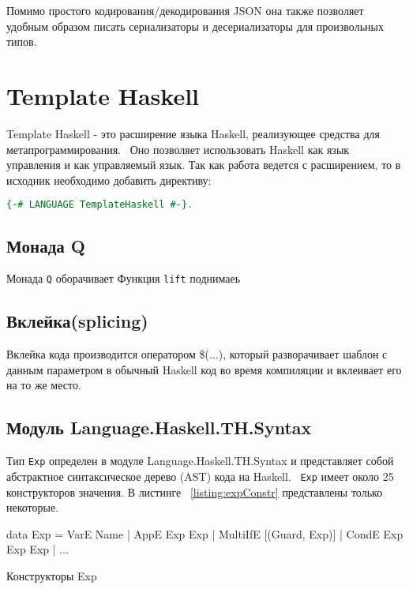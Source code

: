 Помимо простого кодирования/декодирования JSON она также позволяет удобным образом писать сериализаторы и десериализаторы для произвольных типов.

\section{Template Haskell}

Template Haskell - это расширение языка Haskell, реализующее средства для метапрограммирования.~\cite{extensionHub} Оно позволяет использовать Haskell как язык управления и как управляемый язык. Так как работа ведется с расширением, то в исходник необходимо добавить директиву:

\begin{lstlisting}[language=Haskell]
{-# LANGUAGE TemplateHaskell #-}.
\end{lstlisting}

\subsection{Монада Q}

Монада \lstinline{Q} оборачивает Функция \lstinline{lift} поднимаеь

\subsection{Вклейка(splicing)}

Вклейка кода производится оператором  \$(...), который разворачивает шаблон с данным параметром в обычный Haskell код во время компиляции и вклеивает его на то же место. 

\subsection{Модуль Language.Haskell.TH.Syntax~\cite{coverHaskell}}

Тип \lstinline{Exp} определен в модуле Language.Haskell.TH.Syntax и представляет собой абстрактное синтаксическое дерево (AST) кода на Haskell.~\cite{thSyntax} \lstinline{Exp} имеет около 25 конструкторов значения. В листинге ~\ref{listing:expConstr} представлены только некоторые.  

\begin{ListingEnv}[H]
\begin{Verb}
data Exp
       = VarE Name
       | AppE Exp Exp
       | MultiIfE [(Guard, Exp)]
       | CondE Exp Exp Exp
       | ...
\end{Verb}
\caption{Конструкторы Exp}
\label{listing:expConstr}
\end{ListingEnv}

